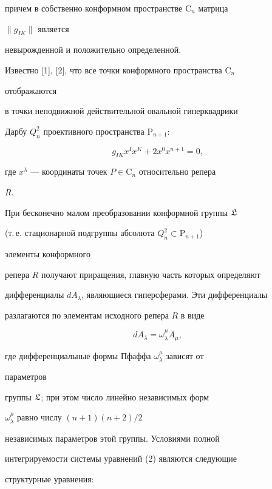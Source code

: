 причем в собственно конформном пространстве $\mathrm C_n$ матрица 


$\|g_{I K}\|$ является 


невырожденной и положительно определенной. 


 


Известно [1], [2], что все точки конформного пространства $\mathrm C_n$ 


отображаются 


в точки неподвижной действительной овальной гиперквадрики 


Дарбу $Q^2_n$ проективного пространства $\mathrm P_{n+1}$: 


$$ 


g_{I K}x^I x^K+2x^0x^{n+1}=0, 


$$ 


где $x^\lambda$ --- координаты точек $P\in\mathrm C_n$ относительно репера 


$R$. 


 


При бесконечно малом преобразовании конформной группы $\frak L$ 


(т.\,е. стационарной подгруппы абсолюта $Q^2_n\subset\mathrm P_{n+1}$) 


элементы конформного 


репера $R$ получают приращения, главную часть которых определяют 


дифференциалы $d A_\lambda$, являющиеся гиперсферами. Эти дифференциалы 


разлагаются по элементам исходного репера $R$ в виде 


\begin{equation} 


d A_\lambda=\omega^\mu_\lambda A_\mu, 


\end{equation} 


где дифференциальные формы Пфаффа $\omega^\mu_\lambda$ зависят от 


параметров 


группы $\frak L$; при этом число линейно независимых форм 


$\omega^\mu_\lambda$ равно числу $(n+1)(n+2)/2$


независимых параметров этой группы. Условиями полной 


интегрируемости системы уравнений (2) являются следующие 


структурные уравнения: 



